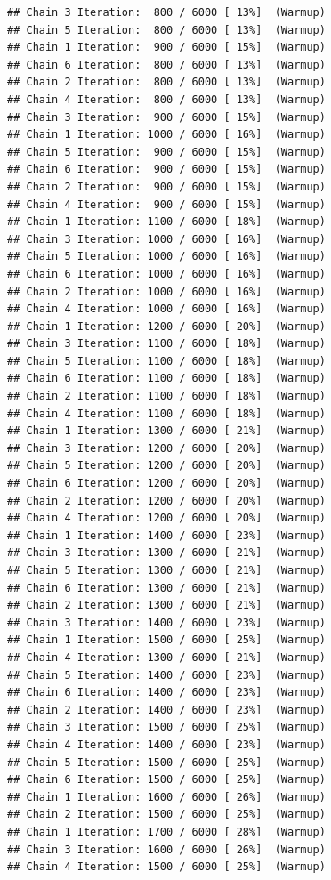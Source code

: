 \documentclass[
]{article}
\begin{document}
\begin{verbatim}
## Chain 3 Iteration:  800 / 6000 [ 13%]  (Warmup) 
## Chain 5 Iteration:  800 / 6000 [ 13%]  (Warmup) 
## Chain 1 Iteration:  900 / 6000 [ 15%]  (Warmup) 
## Chain 6 Iteration:  800 / 6000 [ 13%]  (Warmup) 
## Chain 2 Iteration:  800 / 6000 [ 13%]  (Warmup) 
## Chain 4 Iteration:  800 / 6000 [ 13%]  (Warmup) 
## Chain 3 Iteration:  900 / 6000 [ 15%]  (Warmup) 
## Chain 1 Iteration: 1000 / 6000 [ 16%]  (Warmup) 
## Chain 5 Iteration:  900 / 6000 [ 15%]  (Warmup) 
## Chain 6 Iteration:  900 / 6000 [ 15%]  (Warmup) 
## Chain 2 Iteration:  900 / 6000 [ 15%]  (Warmup) 
## Chain 4 Iteration:  900 / 6000 [ 15%]  (Warmup) 
## Chain 1 Iteration: 1100 / 6000 [ 18%]  (Warmup) 
## Chain 3 Iteration: 1000 / 6000 [ 16%]  (Warmup) 
## Chain 5 Iteration: 1000 / 6000 [ 16%]  (Warmup) 
## Chain 6 Iteration: 1000 / 6000 [ 16%]  (Warmup) 
## Chain 2 Iteration: 1000 / 6000 [ 16%]  (Warmup) 
## Chain 4 Iteration: 1000 / 6000 [ 16%]  (Warmup) 
## Chain 1 Iteration: 1200 / 6000 [ 20%]  (Warmup) 
## Chain 3 Iteration: 1100 / 6000 [ 18%]  (Warmup) 
## Chain 5 Iteration: 1100 / 6000 [ 18%]  (Warmup) 
## Chain 6 Iteration: 1100 / 6000 [ 18%]  (Warmup) 
## Chain 2 Iteration: 1100 / 6000 [ 18%]  (Warmup) 
## Chain 4 Iteration: 1100 / 6000 [ 18%]  (Warmup) 
## Chain 1 Iteration: 1300 / 6000 [ 21%]  (Warmup) 
## Chain 3 Iteration: 1200 / 6000 [ 20%]  (Warmup) 
## Chain 5 Iteration: 1200 / 6000 [ 20%]  (Warmup) 
## Chain 6 Iteration: 1200 / 6000 [ 20%]  (Warmup) 
## Chain 2 Iteration: 1200 / 6000 [ 20%]  (Warmup) 
## Chain 4 Iteration: 1200 / 6000 [ 20%]  (Warmup) 
## Chain 1 Iteration: 1400 / 6000 [ 23%]  (Warmup) 
## Chain 3 Iteration: 1300 / 6000 [ 21%]  (Warmup) 
## Chain 5 Iteration: 1300 / 6000 [ 21%]  (Warmup) 
## Chain 6 Iteration: 1300 / 6000 [ 21%]  (Warmup) 
## Chain 2 Iteration: 1300 / 6000 [ 21%]  (Warmup) 
## Chain 3 Iteration: 1400 / 6000 [ 23%]  (Warmup) 
## Chain 1 Iteration: 1500 / 6000 [ 25%]  (Warmup) 
## Chain 4 Iteration: 1300 / 6000 [ 21%]  (Warmup) 
## Chain 5 Iteration: 1400 / 6000 [ 23%]  (Warmup) 
## Chain 6 Iteration: 1400 / 6000 [ 23%]  (Warmup) 
## Chain 2 Iteration: 1400 / 6000 [ 23%]  (Warmup) 
## Chain 3 Iteration: 1500 / 6000 [ 25%]  (Warmup) 
## Chain 4 Iteration: 1400 / 6000 [ 23%]  (Warmup) 
## Chain 5 Iteration: 1500 / 6000 [ 25%]  (Warmup) 
## Chain 6 Iteration: 1500 / 6000 [ 25%]  (Warmup) 
## Chain 1 Iteration: 1600 / 6000 [ 26%]  (Warmup) 
## Chain 2 Iteration: 1500 / 6000 [ 25%]  (Warmup) 
## Chain 1 Iteration: 1700 / 6000 [ 28%]  (Warmup) 
## Chain 3 Iteration: 1600 / 6000 [ 26%]  (Warmup) 
## Chain 4 Iteration: 1500 / 6000 [ 25%]  (Warmup) 

\end{verbatim}
\end{document}
